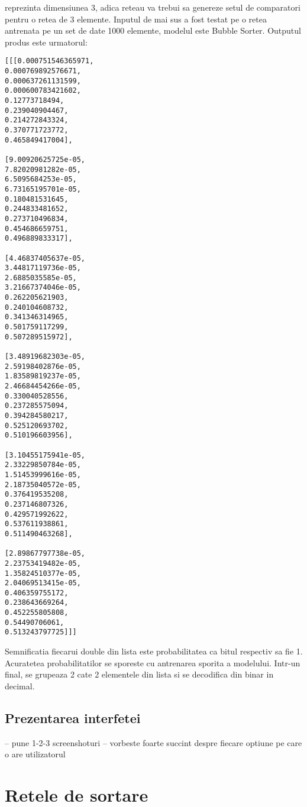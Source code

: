 \documentclass[12pt]{article}
\begin{document}
reprezinta dimensiunea 3, adica reteau va trebui sa genereze setul de comparatori pentru o retea de 3 elemente. Inputul de mai sus a fost testat pe o retea antrenata pe un set de date 1000 elemente, modelul este Bubble Sorter. Outputul produs este urmatorul:
\begin{center}
\begin{multicols}{2}
\begin{lstlisting}
[[[0.000751546365971,
0.000769892576671,
0.000637261131599,
0.000600783421602,
0.12773718494,
0.239040904467,
0.214272843324,
0.370771723772,
0.465849417004],

[9.00920625725e-05,
7.82020981282e-05,
6.5095684253e-05,
6.73165195701e-05,
0.180481531645,
0.244833481652,
0.273710496834,
0.454686659751,
0.496889833317],

[4.46837405637e-05,
3.44817119736e-05,
2.6885035585e-05,
3.21667374046e-05,
0.262205621903,
0.240104608732,
0.341346314965,
0.501759117299,
0.507289515972],

[3.48919682303e-05,
2.59198402876e-05,
1.83589819237e-05,
2.46684454266e-05,
0.330040528556,
0.237285575094,
0.394284580217,
0.525120693702,
0.510196603956],

[3.10455175941e-05,
2.33229850784e-05,
1.51453999616e-05,
2.18735040572e-05,
0.376419535208,
0.237146807326,
0.429571992622,
0.537611938861,
0.511490463268],

[2.89867797738e-05,
2.23753419482e-05,
1.35824510377e-05,
2.04069513415e-05,
0.406359755172,
0.238643669264,
0.452255805808,
0.54490706061,
0.513243797725]]]
\end{lstlisting}
\end{multicols}
\end{center}

Semnificatia fiecarui double din lista este probabilitatea ca bitul respectiv sa fie 1. Acuratetea probabilitatilor se sporeste cu antrenarea sporita a modelului. Intr-un final, se grupeaza 2 cate 2 elementele din lista si se decodifica din binar in decimal.

\subsection{Prezentarea interfetei}

-- pune 1-2-3 screenshoturi
-- vorbeste foarte succint despre fiecare optiune pe care o are utilizatorul

\section{Retele de sortare}
\end{document}
